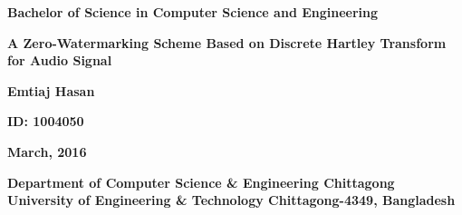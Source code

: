 %


%



\thispagestyle{empty}

\begin{center}
\textbf{{\large Bachelor of Science in Computer Science and Engineering}}

\vspace{75mm}

\textbf{{\large A Zero-Watermarking Scheme Based on Discrete Hartley Transform for Audio Signal} }

\vspace{30mm}

\textbf{Emtiaj Hasan}

\textbf{ID: 1004050}

\vspace{15mm}

\textbf{March, 2016}

\vfill

\textbf{{\large Department of Computer Science \& Engineering} \newline
{\normalsize Chittagong University of Engineering \& Technology} \newline
{\small Chittagong-4349, Bangladesh}}
\end{center}

\newpage


\thispagestyle{empty}

